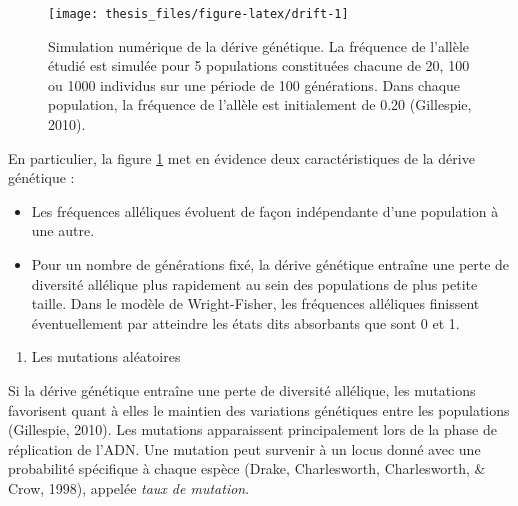 \documentclass[12pt,a4paper,twoside]{ugathesis}
\providecommand{\tightlist}{%
  \setlength{\itemsep}{0pt}\setlength{\parskip}{0pt}}
\theoremstyle{definition}
\theoremstyle{definition}
\theoremstyle{remark}
\begin{document}
\begin{figure}

{\centering \texttt{[image: thesis\_files/figure-latex/drift-1]} 

}

\caption{Simulation numérique de la dérive génétique. La
fréquence de l'allèle étudié est simulée pour 5 populations constituées
chacune de 20, 100 ou 1000 individus sur une période de 100 générations.
Dans chaque population, la fréquence de l'allèle est initialement de
0.20 (Gillespie, 2010).}\label{fig:drift}
\end{figure}
En particulier, la figure \ref{fig:drift} met en évidence deux
caractéristiques de la dérive génétique :
\begin{itemize}
\item
  Les fréquences alléliques évoluent de façon indépendante d'une
  population à une autre.
\item
  Pour un nombre de générations fixé, la dérive génétique entraîne une
  perte de diversité allélique plus rapidement au sein des populations
  de plus petite taille. Dans le modèle de Wright-Fisher, les fréquences
  alléliques finissent éventuellement par atteindre les états dits
  absorbants que sont 0 et 1.
\end{itemize}
\begin{enumerate}
\def\labelenumi{\arabic{enumi}.}
\setcounter{enumi}{1}
\tightlist
\item
  Les mutations aléatoires
\end{enumerate}
Si la dérive génétique entraîne une perte de diversité allélique, les
mutations favorisent quant à elles le maintien des variations génétiques
entre les populations (Gillespie, 2010). Les mutations apparaissent
principalement lors de la phase de réplication de l'ADN. Une mutation
peut survenir à un locus donné avec une probabilité spécifique à chaque
espèce (Drake, Charlesworth, Charlesworth, \& Crow, 1998), appelée
\emph{taux de mutation}.
\end{document}
